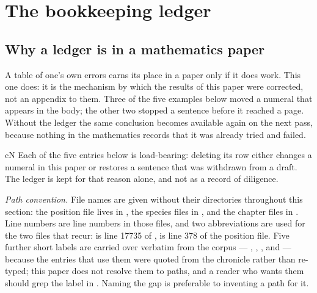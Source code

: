 
\section{The bookkeeping ledger}\label{sec:ledger}

\subsection{Why a ledger is in a mathematics paper}\label{sec:ledger-why}

A table of one's own errors earns its place in a paper only if it does work. This one does: it is the
mechanism by which the results of this paper were corrected, not an appendix to them. Three of the five
examples below moved a numeral that appears in the body; the other two stopped a sentence before it
reached a page. Without the ledger the same conclusion becomes available again on the next pass, because
nothing in the mathematics records that it was already tried and failed.

\begin{claimbox}{cN}
 Each of the five entries below is load-bearing: deleting its row either changes a
numeral in this paper or restores a sentence that was withdrawn from a draft. The ledger is kept for that
reason alone, and not as a record of diligence.
\end{claimbox}

\noindent\emph{Path convention.} File names are given without their directories throughout this section:
the position file lives in , the species files in , and the
chapter files in . Line numbers are line numbers in those files, and two
abbreviations are used for the two files that recur:  is line 17735 of
,  is line 378 of the position file. Five further short labels are
carried over verbatim from the corpus --- , , ,  and
 --- because the entries that use them were quoted from the chronicle rather than
re-typed; this paper does not resolve them to paths, and a reader who wants them should grep the
label in . Naming the gap is preferable to inventing a path for it.

